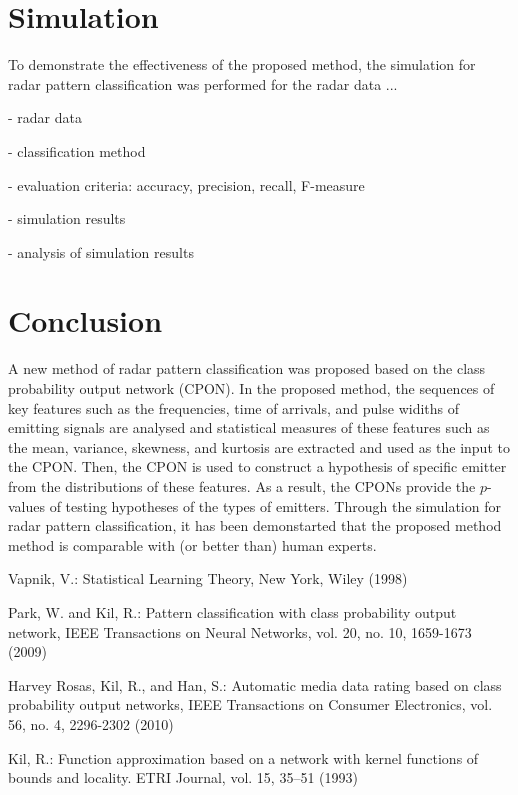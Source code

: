 \documentclass[runningheads,a4paper]{llncs}
\begin{document}
\newpage
\section{Simulation}

To demonstrate the effectiveness of the proposed method, the simulation for radar pattern classification was performed for the radar data ...

- radar data

- classification method

- evaluation criteria: accuracy, precision, recall, F-measure

- simulation results

- analysis of simulation results




\newpage
\section{Conclusion}

A new method of radar pattern classification was proposed based on the class probability output network (CPON). In the proposed method,
the sequences of key features such as the frequencies, time of arrivals, and pulse widiths of emitting signals are analysed and 
statistical measures of these features such as the mean, variance, skewness, and kurtosis are extracted and used as
the input to the CPON. Then, the CPON is used to construct a hypothesis of specific emitter from
the distributions of these features. As a result, the CPONs provide the $p$-values of testing hypotheses of the types of emitters.
Through the simulation for radar pattern classification, it has been demonstarted that the proposed method method is comparable with
(or better than) human experts.




\begin{thebibliography}{4}

 Vapnik, V.: Statistical Learning Theory, New York, Wiley (1998)

 Park, W. and Kil, R.: Pattern classification with class probability output network,
        IEEE Transactions on Neural Networks, vol. 20, no. 10, 1659-1673 (2009)

 Harvey Rosas, Kil, R., and Han, S.: Automatic media data rating based on class probability output networks,
        IEEE Transactions on Consumer Electronics, vol. 56, no. 4, 2296-2302 (2010)

Kil, R.: Function approximation based on a network with kernel
functions of bounds and locality. ETRI Journal, vol. 15, 35--51 (1993)

\end{thebibliography}
\end{document}
